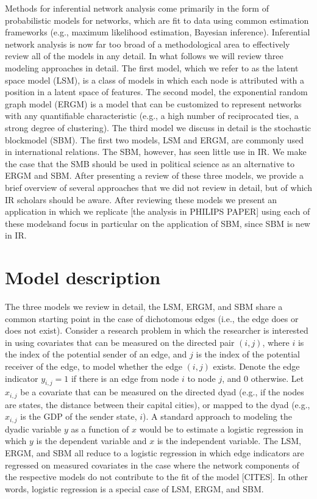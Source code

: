 \documentclass[fleqn,12pt]{wlscirep}
\begin{document}
Methods for inferential network analysis come primarily in the form of probabilistic models for networks, which are fit to data using common estimation frameworks (e.g., maximum likelihood estimation, Bayesian inference). Inferential network analysis is now far too broad of a methodological area to effectively review all of the models in any detail. In what follows we will review three modeling approaches in detail. The first model, which we refer to as the latent space model (LSM), is a class of models in which each node is attributed with a position in a latent space of features. The second model, the exponential random graph model (ERGM) is a model that can be customized to represent networks with any quantifiable characteristic (e.g., a high number of reciprocated ties, a strong degree of clustering).  The third model we discuss in detail is the stochastic blockmodel (SBM). The first two models, LSM and ERGM, are commonly used in international relations. The SBM, however, has seen little use in IR. We make the case that the SMB should be used in political science as an alternative to ERGM and SBM. After presenting a review of these three models, we provide a brief overview of several approaches that we did not review in detail, but of which IR scholars should be aware. After reviewing these models we present an application in which we replicate [the analysis in PHILIPS PAPER] using each of these modelsand focus in particular on the application of SBM, since SBM is new in IR.

\section{Model description}

The three models we review in detail, the LSM, ERGM, and SBM share a common starting point in the case of dichotomous edges (i.e., the edge does or does not exist). Consider a research problem in which the researcher is interested in using covariates that can be measured on the directed pair $(i,j)$, where $i$ is the index of the potential sender of an edge, and $j$ is the index of the potential receiver of the edge, to model whether the edge $(i,j)$ exists. Denote the edge indicator $y_{i,j} = 1$  if there is an edge from node $i$ to node $j$, and 0 otherwise. Let $x_{i,j}$ be a covariate that can be measured on the directed dyad (e.g., if the nodes are states, the distance between their capital cities), or mapped to the dyad (e.g., $x_{i,j}$ is the GDP of the sender state, $i$). A standard approach to modeling the dyadic variable $y$ as a function of $x$ would be to estimate a logistic regression in which $y$ is the dependent variable and $x$ is the independent variable. The LSM, ERGM, and SBM all reduce to a logistic regression in which edge indicators are regressed on measured covariates in the case where the network components of the respective models do not contribute to the fit of the model [CITES]. In other words, logistic regression is a special case of LSM, ERGM, and SBM. 
\end{document}
